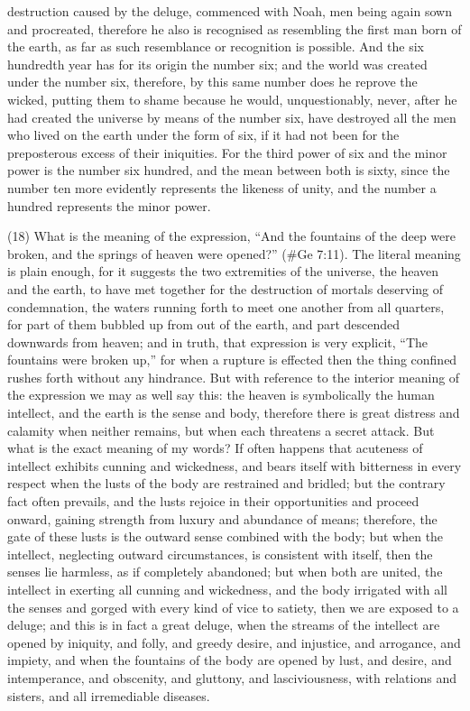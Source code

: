 destruction caused by the deluge, commenced with Noah, men being again sown and procreated,
therefore he also is recognised as resembling the first man born of the earth, as far as such
resemblance or recognition is possible. And the six hundredth year has for its origin the number
six; and the world was created under the number six, therefore, by this same number does he
reprove the wicked, putting them to shame because he would, unquestionably, never, after he had
created the universe by means of the number six, have destroyed all the men who lived on the
earth under the form of six, if it had not been for the preposterous excess of their iniquities. For the
third power of six and the minor power is the number six hundred, and the mean between both is
sixty, since the number ten more evidently represents the likeness of unity, and the number a
hundred represents the minor power.

(18) What is the meaning of the expression, ``And the fountains of the deep were broken, and the
springs of heaven were opened?'' (\#Ge 7:11). The literal meaning is plain enough, for it
suggests the two extremities of the universe, the heaven and the earth, to have met together for
the destruction of mortals deserving of condemnation, the waters running forth to meet one
another from all quarters, for part of them bubbled up from out of the earth, and part descended
downwards from heaven; and in truth, that expression is very explicit, ``The fountains were broken
up,'' for when a rupture is effected then the thing confined rushes forth without any hindrance. But
with reference to the interior meaning of the expression we may as well say this: the heaven is
symbolically the human intellect, and the earth is the sense and body, therefore there is great
distress and calamity when neither remains, but when each threatens a secret attack. But what is
the exact meaning of my words? If often happens that acuteness of intellect exhibits cunning and
wickedness, and bears itself with bitterness in every respect when the lusts of the body are
restrained and bridled; but the contrary fact often prevails, and the lusts rejoice in their
opportunities and proceed onward, gaining strength from luxury and abundance of means;
therefore, the gate of these lusts is the outward sense combined with the body; but when the
intellect, neglecting outward circumstances, is consistent with itself, then the senses lie harmless,
as if completely abandoned; but when both are united, the intellect in exerting all cunning and
wickedness, and the body irrigated with all the senses and gorged with every kind of vice to satiety,
then we are exposed to a deluge; and this is in fact a great deluge, when the streams of the
intellect are opened by iniquity, and folly, and greedy desire, and injustice, and arrogance, and
impiety, and when the fountains of the body are opened by lust, and desire, and intemperance, and
obscenity, and gluttony, and lasciviousness, with relations and sisters, and all irremediable
diseases.

